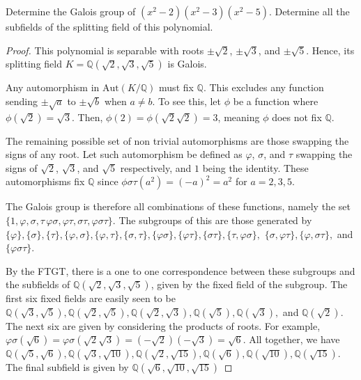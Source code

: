 \documentclass[10pt]{article}
\newcommand{\Q}{\mathbb{Q}}
\newenvironment{problem}[2][Problem]{\begin{trivlist}
		\item[\hskip \labelsep {\bfseries #1}\hskip \labelsep {\bfseries #2.}]}{\end{trivlist}}
\begin{document}
	\begin{problem}{2.3}
		Determine the Galois group of $(x^2 - 2)(x^2 - 3)(x^2 - 5)$. Determine all the subfields of the splitting field of this polynomial.
		\begin{proof}
			This polynomial is separable with roots $\pm\sqrt{2}$, $\pm\sqrt{3}$, and $\pm\sqrt{5}$. Hence, its splitting field $K = \Q(\sqrt{2},\sqrt{3},\sqrt{5})$ is Galois.
			
			Any automorphism in $\text{Aut}(K/\Q)$ must fix $\Q$. This excludes any function sending $\pm \sqrt{a}$ to $\pm \sqrt{b}$ when $a \not = b$. To see this, let $\phi$ be a function where $\phi(\sqrt{2}) = \sqrt{3}$. Then, $\phi(2) = \phi(\sqrt{2}\sqrt{2}) = 3$, meaning $\phi$ does not fix $\Q$.
			
			The remaining possible set of non trivial automorphisms are those swapping the signs of any root. Let such automorphism be defined as $\varphi$, $\sigma$, and $\tau$ swapping the signs of $\sqrt{2}$, $\sqrt{3}$, and $\sqrt{5}$ respectively, and $1$ being the identity. These automorphisms fix $\Q$ since $\phi\sigma\tau(a^2) = (-a)^2 = a^2$ for $a=2,3,5$.
			
			The Galois group is therefore all combinations of these functions, namely the set $\{1, \varphi, \sigma, \tau\, \varphi\sigma, \varphi\tau, \sigma\tau, \varphi\sigma\tau\}$. The subgroups of this are those generated by $\{\varphi\}, \{\sigma\}, \{\tau\}, \{\varphi,\sigma\}, \{\varphi,\tau\}, \{\sigma,\tau\}, \{\varphi\sigma\}, \{\varphi\tau\},\{\sigma\tau\},\{\tau, \varphi\sigma\},$
			$\{\sigma,\varphi\tau\}, \{\varphi, \sigma\tau\},$ and $\{\varphi\sigma\tau\}$.
			
			By the FTGT, there is a one to one correspondence between these subgroups and the subfields of $\Q(\sqrt{2},\sqrt{3},\sqrt{5})$, given by the fixed field of the subgroup. The first six fixed fields are easily seen to be $\Q(\sqrt{3},\sqrt{5}), \Q(\sqrt{2},\sqrt{5}), \Q(\sqrt{2},\sqrt{3}), \Q(\sqrt{5}), \Q(\sqrt{3}),$ and $\Q(\sqrt{2})$. The next six are given by considering the products of roots. For example, $\varphi\sigma(\sqrt{6}) = \varphi\sigma(\sqrt{2}\sqrt{3}) = (-\sqrt{2})(-\sqrt{3}) = \sqrt{6}$. All together, we have $\Q(\sqrt{5}, \sqrt{6}), \Q(\sqrt{3},\sqrt{10}),\Q(\sqrt{2},\sqrt{15}), \Q(\sqrt{6}), \Q(\sqrt{10}),\Q(\sqrt{15})$. The final subfield is given by $\Q(\sqrt{6},\sqrt{10},\sqrt{15})$
		\end{proof}
	\end{problem}
		
\end{document}
